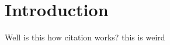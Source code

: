 \documentclass[12pt]{article}
\begin{document}
\section*{Introduction}

Well is this how citation works?\cite{Minna2021}
this is weird \cite{Skopik2021}





\end{document}
